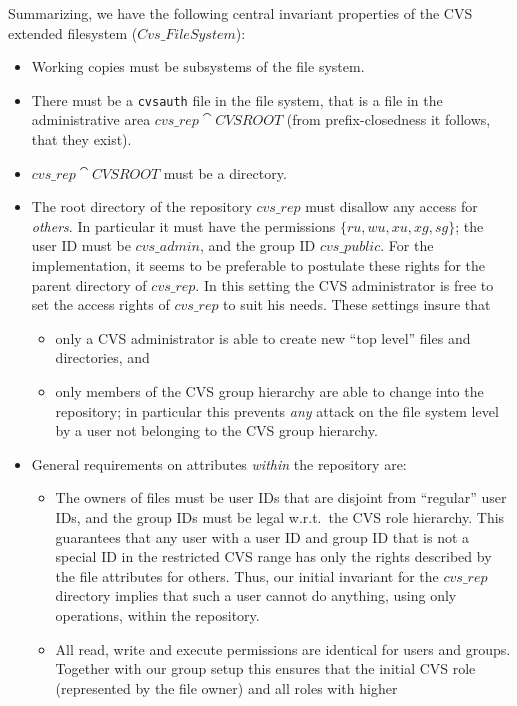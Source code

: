 Summarizing, we have the following central invariant properties of the CVS
extended filesystem ($Cvs\_FileSystem$):
\begin{itemize}
\item Working copies must be subsystems of the file system.
\item There must be a \texttt{cvsauth} file in the file system, that is a file
  in the administrative area $cvs\_rep \cat CVSROOT$ (from prefix-closedness it
  follows, that they exist).
\item $cvs\_rep \cat CVSROOT$ must be a directory.
\item The root directory of the repository $cvs\_rep$ must disallow any access
  for \emph{others}. In particular it must have the permissions $\{ru, wu, xu,
  xg, sg\}$; the user ID must be $cvs\_admin$, and the group ID $cvs\_public$.
  For the implementation, it seems to be preferable to postulate these rights
  for the parent directory of $cvs\_rep$.  In this setting the CVS administrator
  is free to set the access rights of $cvs\_rep$ to suit his needs.  These
  settings insure that
  \begin{itemize}
  \item only a CVS administrator is able to create new ``top level'' files and
    directories, and 
  \item only members of the CVS group hierarchy are able to change into the
    repository; in particular this prevents \emph{any} attack on the \unix{}
    file system level by a user not belonging to the CVS group hierarchy.
  \end{itemize}
\item General requirements on attributes \emph{within} the repository are:
  \begin{itemize}
  \item The owners of files must be \unix{} user IDs that are disjoint from
    ``regular'' \unix{} user IDs, and the group IDs must be legal w.r.t.\ the
    CVS role hierarchy.  This guarantees that any \unix{} user with a user ID
    and group ID that is not a special \unix{} ID in the restricted CVS range
    has only the rights described by the file attributes for others. Thus, our
    initial invariant for the $cvs\_rep$ directory implies that such a user
    cannot do anything, using only \unix{} operations, within the repository.
  \item All read, write and execute permissions are identical for users and
    groups.  Together with our group setup this ensures that the initial CVS
    role (represented by the \unix{} file owner) and all roles with higher

\end{itemize}
\end{itemize}
